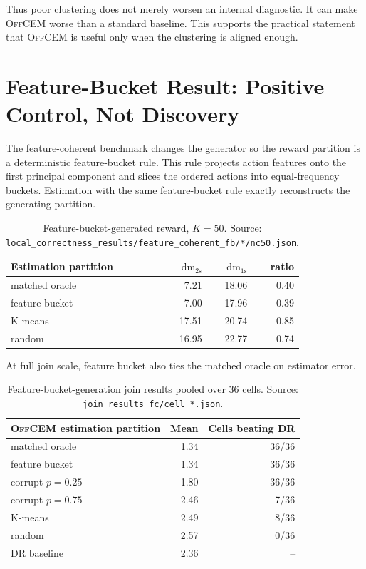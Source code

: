 \documentclass[11pt]{article}
\newcommand{\OffCEM}{\textsc{OffCEM}}
\newcommand{\DR}{\textsc{DR}}
\newcommand{\relMSE}{\mathrm{relMSE}}
\newcommand{\dm}{\mathrm{dm}}
\begin{document}
Thus poor clustering does not merely worsen an internal diagnostic. It can make
\OffCEM{} worse than a standard baseline. This supports the practical statement
that \OffCEM{} is useful only when the clustering is aligned enough.

\section{Feature-Bucket Result: Positive Control, Not Discovery}

The feature-coherent benchmark changes the generator so the reward partition is
a deterministic feature-bucket rule. This rule projects action features onto the
first principal component and slices the ordered actions into equal-frequency
buckets. Estimation with the same feature-bucket rule exactly reconstructs the
generating partition.

\begin{table}[h]
\centering
\caption{Feature-bucket-generated reward, $K=50$. Source:
\texttt{local_correctness_results/feature_coherent_fb/*/nc50.json}.}
\begin{tabular}{lrrr}
\toprule
Estimation partition & $\dm_{\mathrm{2s}}$ & $\dm_{\mathrm{1s}}$ & ratio \\
\midrule
matched oracle & 7.21 & 18.06 & 0.40 \\
feature bucket & 7.00 & 17.96 & 0.39 \\
K-means & 17.51 & 20.74 & 0.85 \\
random & 16.95 & 22.77 & 0.74 \\
\bottomrule
\end{tabular}
\end{table}

At full join scale, feature bucket also ties the matched oracle on estimator
error.

\begin{table}[h]
\centering
\caption{Feature-bucket-generation join results pooled over 36 cells. Source:
\texttt{join_results_fc/cell_*.json}.}
\begin{tabular}{lrr}
\toprule
\OffCEM{} estimation partition & Mean \relMSE{} & Cells beating \DR{} \\
\midrule
matched oracle & 1.34 & 36/36 \\
feature bucket & 1.34 & 36/36 \\
corrupt $p=0.25$ & 1.80 & 36/36 \\
corrupt $p=0.75$ & 2.46 & 7/36 \\
K-means & 2.49 & 8/36 \\
random & 2.57 & 0/36 \\
\DR{} baseline & 2.36 & -- \\
\bottomrule
\end{tabular}
\end{table}
\end{document}
